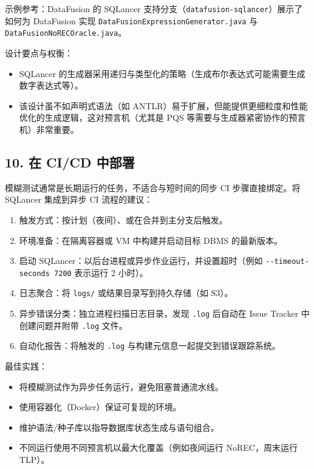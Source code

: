 \documentclass[
]{article}
\providecommand{\tightlist}{%
  \setlength{\itemsep}{0pt}\setlength{\parskip}{0pt}}
\begin{document}
示例参考：DataFusion 的 SQLancer
支持分支（\texttt{datafusion-sqlancer}）展示了如何为 DataFusion 实现
\texttt{DataFusionExpressionGenerator.java} 与
\texttt{DataFusionNoRECOracle.java}。

设计要点与权衡：

\begin{itemize}
\tightlist
\item
  SQLancer
  的生成器采用递归与类型化的策略（生成布尔表达式可能需要生成数字表达式等）。\\
\item
  该设计虽不如声明式语法（如
  ANTLR）易于扩展，但能提供更细粒度和性能优化的生成逻辑，这对预言机（尤其是
  PQS 等需要与生成器紧密协作的预言机）非常重要。
\end{itemize}

\subsection{10. 在 CI/CD 中部署}\label{ux5728-cicd-ux4e2dux90e8ux7f72}

模糊测试通常是长期运行的任务，不适合与短时间的同步 CI 步骤直接绑定。将
SQLancer 集成到异步 CI 流程的建议：

\begin{enumerate}
\def\labelenumi{\arabic{enumi}.}
\tightlist
\item
  触发方式：按计划（夜间）、或在合并到主分支后触发。\\
\item
  环境准备：在隔离容器或 VM 中构建并启动目标 DBMS 的最新版本。\\
\item
  启动 SQLancer：以后台进程或异步作业运行，并设置超时（例如
  \texttt{-\/-timeout-seconds\ 7200} 表示运行 2 小时）。
\item
  日志聚合：将 \texttt{logs/} 或结果目录写到持久存储（如 S3）。
\item
  异步错误分类：独立进程扫描日志目录，发现 \texttt{.log} 后自动在 Issue
  Tracker 中创建问题并附带 \texttt{.log} 文件。\\
\item
  自动化报告：将触发的 \texttt{.log}
  与构建元信息一起提交到错误跟踪系统。
\end{enumerate}

最佳实践：

\begin{itemize}
\tightlist
\item
  将模糊测试作为异步任务运行，避免阻塞普通流水线。\\
\item
  使用容器化（Docker）保证可复现的环境。\\
\item
  维护语法/种子库以指导数据库状态生成与语句组合。\\
\item
  不同运行使用不同预言机以最大化覆盖（例如夜间运行 NoREC，周末运行
  TLP）。
\end{itemize}
\end{document}
